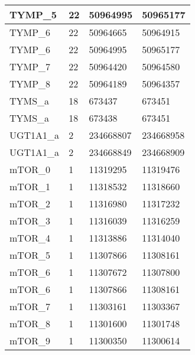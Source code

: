 \begin{longtable}{| p{} | C{.10\textwidth} | C{.35\textwidth} | C{.35\textwidth} |}
TYMP\_5                 & 22           & 50964995              & 50965177            \\ \hline
TYMP\_6                 & 22           & 50964665              & 50964915            \\ \hline
TYMP\_6                 & 22           & 50964995              & 50965177            \\ \hline
TYMP\_7                 & 22           & 50964420              & 50964580            \\ \hline
TYMP\_8                 & 22           & 50964189              & 50964357            \\ \hline
TYMS\_a                 & 18           & 673437                & 673451              \\ \hline
TYMS\_a                 & 18           & 673438                & 673451              \\ \hline
UGT1A1\_a               & 2            & 234668807             & 234668958           \\ \hline
UGT1A1\_a               & 2            & 234668849             & 234668909           \\ \hline
mTOR\_0                 & 1            & 11319295              & 11319476            \\ \hline
mTOR\_1                 & 1            & 11318532              & 11318660            \\ \hline
mTOR\_2                 & 1            & 11316980              & 11317232            \\ \hline
mTOR\_3                 & 1            & 11316039              & 11316259            \\ \hline
mTOR\_4                 & 1            & 11313886              & 11314040            \\ \hline
mTOR\_5                 & 1            & 11307866              & 11308161            \\ \hline
mTOR\_6                 & 1            & 11307672              & 11307800            \\ \hline
mTOR\_6                 & 1            & 11307866              & 11308161            \\ \hline
mTOR\_7                 & 1            & 11303161              & 11303367            \\ \hline
mTOR\_8                 & 1            & 11301600              & 11301748            \\ \hline
mTOR\_9                 & 1            & 11300350              & 11300614            \\ \hline

\end{longtable}
